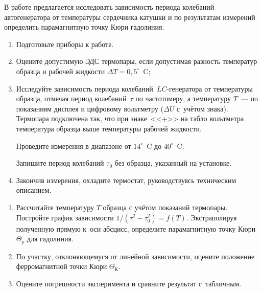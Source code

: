 \begin{lab:task}

В работе предлагается исследовать зависимость периода колебаний
автогенератора от температуры сердечника катушки и по результатам измерений
определить парамагнитную точку Кюри гадолиния.

	\begin{enumerate}
		\item Подготовьте приборы к работе.

		\item Оцените допустимую ЭДС термопары, если допустимая разность
температур образца и рабочей жидкости $\Delta T=0,5^\circ$~C;

		\item Исследуйте зависимость периода колебаний~$LC$-генератора от
температуры образца, отмечая период колебаний~$\tau$
		по частотомеру, а температуру $T$~--- по показаниям дисплея и цифровому
вольтметру ($\Delta U$ с~учётом знака). Термопара
		подключена так, что при знаке~<<+>> на табло вольтметра температура
образца выше температуры рабочей жидкости.

		Проведите измерения в диапазоне от $14^\circ$~C до $40^\circ$~C.

		Запишите период колебаний $\tau_0$ без образца, указанный на установке.

		\item Закончив измерения, охладите термостат, руководствуясь техническим
описанием.

	\end{enumerate}

	\begin{enumerate}

		\item Рассчитайте температуру $T$ образца с учётом показаний термопары.
Постройте график зависимости $1/(\tau^2-\tau_0^2)=f(T)$.
		Экстраполируя полученную прямую к~оси абсцисс, определите парамагнитную
точку Кюри~$\Theta_p$ для гадолиния.

        \item По участку, отклоняющемуся от линейной зависимости, оцените
        положение ферромагнитной точки Кюри $\Theta_К$.
		\item Оцените погрешности эксперимента и сравните результат с~табличным.

	\end{enumerate}

\end{lab:task}


